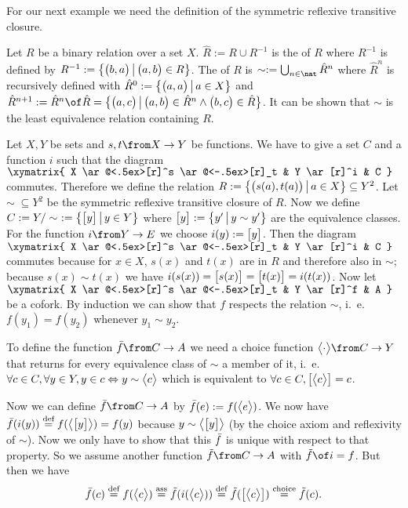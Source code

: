 For our next example we need the definition of the symmetric reflexive transitive closure.

\begin{definition}
  \label{def:srtc}
  Let $R$ be a binary relation over a set $X$.
  $\hat{R} := R \cup R^{-1}$ is the  of $R$ where $R^{-1}$ is defined by
  $R^{-1} := \bigl \{ \bigl( b , a \bigr) \,\big|\, \bigl( a , b \bigr) \in R \bigr \}$.
  The  of $R$ is $\sim := \bigcup_{n\in\nat} {\hat R}^n$
  where ${\hat R}^n$ is recursively defined with
  ${\hat R}^0 := \bigl \{ \bigl( a , a \bigr) \,\big|\, a \in X \bigr \}$ and
  ${\hat R}^{n+1} := {\hat R}^n \of \hat R = \setMap{\pair{a}{c}}{\pair{a}{b} \in {\hat R}^n \land \pair{b}{c} \in \hat R}$.
  It can be shown that $\sim$ is the least equivalence relation containing $R$.
\end{definition}

\begin{example}
  \label{ex:coequa:quotient}
  Let $X, Y$ be sets and $s, t \from X \to Y$ be functions.
  We have to give a set $C$ and a function $i$ such that the diagram
  $ \xymatrix{
    X \ar@<.5ex>[r]^s \ar@<-.5ex>[r]_t & Y \ar[r]^i & C
  } $
  commutes.
  Therefore we define the relation
  $R := \bigl \{ \bigl( s(a) , t(a) \bigr) \,\big|\, a \in X \bigr \} \subseteq Y^2$.
  Let $\sim \; \subseteq Y^2$ be the symmetric reflexive transitive closure of $R$.
  Now we define $C := Y / \sim ~:= \bigl \{ \bigl[ y \bigr] \,\big|\, y \in Y \bigr \}$ where $\bigl[ y \bigr] := \bigl \{ y' \,\big|\, y \sim y' \bigr \}$ are the equivalence classes.
  For the function $i \from Y \to E$ we choose $i(y) := \bigl[ y \bigr]$.
  Then the diagram
  $ \xymatrix{
    X \ar@<.5ex>[r]^s \ar@<-.5ex>[r]_t & Y \ar[r]^i & C
  } $
  commutes because for $x \in X$, $s(x)$ and $t(x)$ are in $R$ and therefore also in $\sim$; because $s(x) \sim t(x)$ we have $i(s(x)) = \bigl[ s(x) \bigr] = \bigl[ t(x) \bigr] = i(t(x))$.
  Now let
  $ \xymatrix{
    X \ar@<.5ex>[r]^s \ar@<-.5ex>[r]_t & Y \ar[r]^f & A
  } $
  be a cofork.
  By induction we can show that $f$ respects the relation $\sim$, i.~e. $f(y_1) = f(y_2)$ whenever $y_1 \sim y_2$.

  To define the function $\fbar \from C \to A$ we need a choice function $\choice \cdot \from C \to Y$ that returns for every equivalence class of $\sim$ a member of it, i.~e.
  $\forall c \in C, \forall y \in Y, y \in c \Leftrightarrow y \sim \bigl< c \bigr>$
  which is equivalent to $\forall c \in C, \bigl[ \bigl< c \bigr> \bigr] = c$.

  Now we can define $\fbar \from C \to A$ by $\bar{f}(e) := f(\bigl< e \bigr>)$.
  We now have  $\bar{f}(i(y)) \stackrel{\text{def}}{=} f(\bigl< \bigl[ y \bigr] \bigr>) = f(y)$ because $y \sim \bigl< \bigl[ y \bigr] \bigr>$ (by the choice axiom and reflexivity of $\sim$).
  Now we only have to show that this $\bar{f}$ is unique with respect to that property.
  So we assume another function $\ftilde \from C \to A$ with $\ftilde \of i = f$. But then we have
  $$ \bar{f}(c) \stackrel{\text{def}}{=} f(\bigl< c \bigr>) \stackrel{\text{ass}}{=} \tilde{f}(i(\bigl< c \bigr>)) \stackrel{\text{def}}{=} \tilde{f}(\bigl[ \bigl< c \bigr> \bigr]) \stackrel{\text{choice}}{=} \tilde{f}(c).$$
\end{example}


